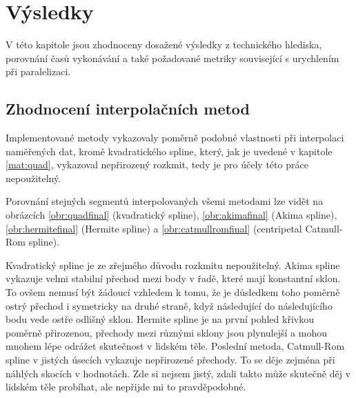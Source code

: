 \documentclass[]{thesiskiv}
\begin{document}
\chapter{Výsledky}

V této kapitole jsou zhodnoceny dosažené výsledky z technického hlediska, porovnání časů vykonávání a také požadované metriky související s urychlením při paralelizaci.

\section{Zhodnocení interpolačních metod}

Implementované metody vykazovaly poměrně podobné vlastnosti při interpolaci naměřených dat, kromě kvadratického spline, který, jak je uvedené v kapitole \ref{mat:quad}, vykazoval nepřirozený rozkmit, tedy je pro účely této práce nepoužitelný.

Porovnání stejných segmentů interpolovaných všemi metodami lze vidět na obrázcích \ref{obr:quadfinal} (kvadratický spline), \ref{obr:akimafinal} (Akima spline), \ref{obr:hermitefinal} (Hermite spline) a \ref{obr:catmullromfinal} (centripetal Catmull-Rom spline).

Kvadratický spline je ze zřejmého důvodu rozkmitu nepoužitelný. Akima spline vykazuje velmi stabilní přechod mezi body v řadě, které mají konstantní sklon. To ovšem nemusí být žádoucí vzhledem k tomu, že je důsledkem toho poměrně ostrý přechod i symetricky na druhé straně, když následující do následujícího bodu vede ostře odlišný sklon. Hermite spline je na první pohled křivkou poměrně přirozenou, přechody mezi různými sklony jsou plynulejší a mohou mnohem lépe odrážet skutečnost v lidském těle. Poslední metoda, Catmull-Rom spline v jistých úsecích vykazuje nepřirozené přechody. To se děje zejména při náhlých skocích v hodnotách. Zde si nejsem jistý, zdali takto může skutečně děj v lidském těle probíhat, ale nepřijde mi to pravděpodobné.
\end{document}

